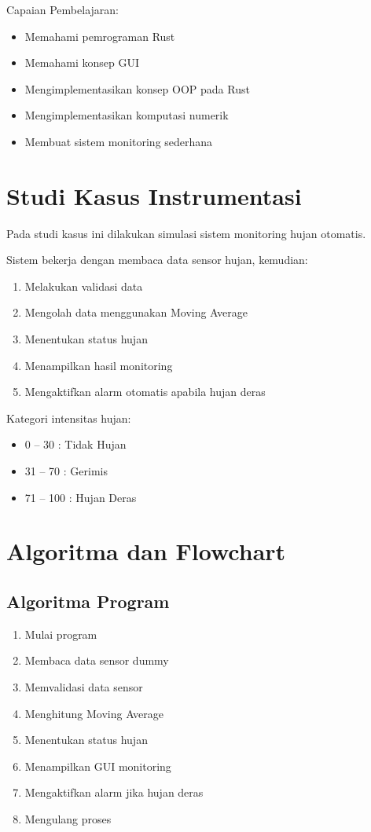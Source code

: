 \documentclass[a4paper,12pt]{article}
\begin{document}
Capaian Pembelajaran:
\begin{itemize}
    \item Memahami pemrograman Rust
    \item Memahami konsep GUI
    \item Mengimplementasikan konsep OOP pada Rust
    \item Mengimplementasikan komputasi numerik
    \item Membuat sistem monitoring sederhana
\end{itemize}

\section{Studi Kasus Instrumentasi}

Pada studi kasus ini dilakukan simulasi sistem monitoring hujan otomatis.

Sistem bekerja dengan membaca data sensor hujan, kemudian:
\begin{enumerate}
    \item Melakukan validasi data
    \item Mengolah data menggunakan Moving Average
    \item Menentukan status hujan
    \item Menampilkan hasil monitoring
    \item Mengaktifkan alarm otomatis apabila hujan deras
\end{enumerate}

Kategori intensitas hujan:
\begin{itemize}
    \item 0 -- 30 : Tidak Hujan
    \item 31 -- 70 : Gerimis
    \item 71 -- 100 : Hujan Deras
\end{itemize}

\section{Algoritma dan Flowchart}

\subsection{Algoritma Program}

\begin{enumerate}
    \item Mulai program
    \item Membaca data sensor dummy
    \item Memvalidasi data sensor
    \item Menghitung Moving Average
    \item Menentukan status hujan
    \item Menampilkan GUI monitoring
    \item Mengaktifkan alarm jika hujan deras
    \item Mengulang proses
\end{enumerate}
\end{document}

